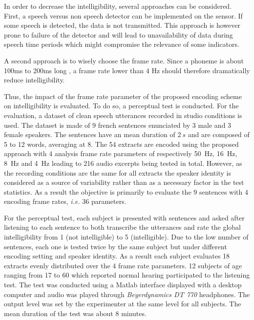 \documentclass[sensors,article,submit,moreauthors,pdftex,10pt,a4paper]{mdpi}
\begin{document}
In order to decrease the intelligibility, several approaches can be considered. First, a speech versus non speech detector can be implemented on the sensor. If some speech is detected, the data is not transmitted. This approach is however prone to failure of the detector and will lead to unavailability of data during speech time periods which might compromise the relevance of some indicators.

A second approach is to wisely choose the frame rate. Since a phoneme is about 100ms to 200ms long \cite{kuwabara1996acoustic} \cite{rosen1992temporal}, a frame rate lower than 4 Hz should therefore dramatically reduce intelligibility.

Thus, the impact of the frame rate parameter of the proposed encoding scheme on intelligibility is evaluated. To do so, a perceptual test is conducted. For the evaluation, a dataset of clean speech utterances recorded in studio conditions is used. The dataset is made of 9 french sentences enunciated by 3 male and 3 female speakers. The sentences have an mean duration of $2~s$ and are composed of 5 to 12 words, averaging at 8. The 54 extracts are encoded using the proposed approach with 4 analysis frame rate parameters of respectively 50~Hz, 16~Hz, 8~Hz and 4~Hz leading to 216 audio excerpts being tested in total. However, as the recording conditions are the same for all extracts the speaker identity is considered as a source of variability rather than as a necessary factor in the test statistics. As a result the objective is primarily to evaluate the 9 sentences with 4 encoding frame rates, \textit{i.e.} 36 parameters.

For the perceptual test, each subject is presented with sentences and asked after listening to each sentence to both transcribe the utterances and rate the global intelligibility from 1 (not intelligible) to 5 (intelligible). Due to the low number of sentences, each one is tested twice by the same subject but under different encoding setting and speaker identity. As a result each subject evaluates 18 extracts evenly distributed over the 4 frame rate parameters. 12 subjects of age ranging from 17 to 60 which reported normal hearing participated to the listening test. The test was conducted using a Matlab interface displayed with a desktop computer and audio was played through \textit{Beyerdynamics DT 770} headphones. The output level was set by the experimenter at the same level for all subjects. The mean duration of the test was about 8 minutes.
\end{document}
